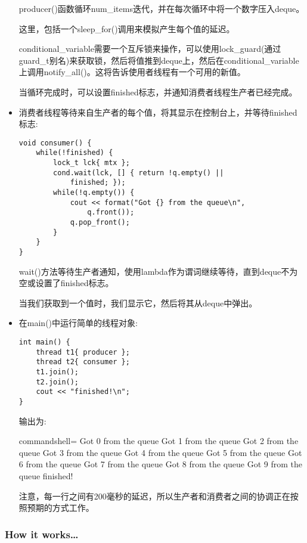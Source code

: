 \begin{itemize}
producer()函数循环num\_items迭代，并在每次循环中将一个数字压入deque。

这里，包括一个sleep\_for()调用来模拟产生每个值的延迟。

conditional\_variable需要一个互斥锁来操作，可以使用lock\_guard(通过guard\_t别名)来获取锁，然后将值推到deque上，然后在conditional\_variable上调用notify\_all()。这将告诉使用者线程有一个可用的新值。

当循环完成时，可以设置finished标志，并通知消费者线程生产者已经完成。

\item 
消费者线程等待来自生产者的每个值，将其显示在控制台上，并等待finished标志:

\begin{lstlisting}[style=styleCXX]
void consumer() {
	while(!finished) {
		lock_t lck{ mtx };
		cond.wait(lck, [] { return !q.empty() ||
			finished; });
		while(!q.empty()) {
			cout << format("Got {} from the queue\n",
				q.front());
			q.pop_front();
		}
	}
}
\end{lstlisting}

wait()方法等待生产者通知，使用lambda作为谓词继续等待，直到deque不为空或设置了finished标志。

当我们获取到一个值时，我们显示它，然后将其从deque中弹出。

\item 
在main()中运行简单的线程对象:

\begin{lstlisting}[style=styleCXX]
int main() {
	thread t1{ producer };
	thread t2{ consumer };
	t1.join();
	t2.join();
	cout << "finished!\n";
}
\end{lstlisting}

输出为:

\begin{tcblisting}{commandshell={}}
Got 0 from the queue
Got 1 from the queue
Got 2 from the queue
Got 3 from the queue
Got 4 from the queue
Got 5 from the queue
Got 6 from the queue
Got 7 from the queue
Got 8 from the queue
Got 9 from the queue
finished!
\end{tcblisting}

注意，每一行之间有200毫秒的延迟，所以生产者和消费者之间的协调正在按照预期的方式工作。

\end{itemize}

\subsubsection{How it works…}

